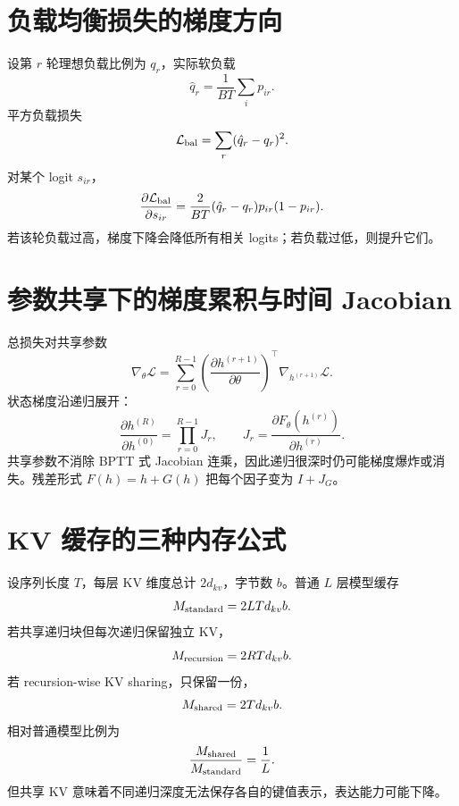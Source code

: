 \documentclass[UTF8,12pt,a4paper,fontset=none]{ctexart}
\numberwithin{equation}{section}
\newcommand{\Loss}{\mathcal{L}}
\begin{document}
\section{负载均衡损失的梯度方向}
设第 $r$ 轮理想负载比例为 $q_r$，实际软负载
\begin{equation}
 \hat q_r=\frac1{BT}\sum_i p_{ir}.
\end{equation}
平方负载损失
\begin{equation}
 \Loss_{\rm bal}=\sum_r(\hat q_r-q_r)^2.
\end{equation}
对某个 logit $s_{ir}$，
\begin{equation}
 \frac{\partial\Loss_{\rm bal}}{\partial s_{ir}}
 =\frac{2}{BT}(\hat q_r-q_r)p_{ir}(1-p_{ir}).
\end{equation}
若该轮负载过高，梯度下降会降低所有相关 logits；若负载过低，则提升它们。

\section{参数共享下的梯度累积与时间 Jacobian}
总损失对共享参数
\begin{equation}
 \nabla_\theta\Loss
 =\sum_{r=0}^{R-1}
 \left(\frac{\partial h^{(r+1)}}{\partial\theta}\right)^\top
 \nabla_{h^{(r+1)}}\Loss.
\end{equation}
状态梯度沿递归展开：
\begin{equation}
 \frac{\partial h^{(R)}}{\partial h^{(0)}}
 =\prod_{r=0}^{R-1}J_r,
 \qquad J_r=\frac{\partial F_\theta(h^{(r)})}{\partial h^{(r)}}.
\end{equation}
共享参数不消除 BPTT 式 Jacobian 连乘，因此递归很深时仍可能梯度爆炸或消失。残差形式 $F(h)=h+G(h)$ 把每个因子变为 $I+J_G$。

\section{KV 缓存的三种内存公式}
设序列长度 $T$，每层 KV 维度总计 $2d_{kv}$，字节数 $b$。普通 $L$ 层模型缓存
\begin{equation}
 M_{\rm standard}=2LTd_{kv}b.
\end{equation}
若共享递归块但每次递归保留独立 KV，
\begin{equation}
 M_{\rm recursion}=2RTd_{kv}b.
\end{equation}
若 recursion-wise KV sharing，只保留一份，
\begin{equation}
 M_{\rm shared}=2Td_{kv}b.
\end{equation}
相对普通模型比例为
\begin{equation}
 \frac{M_{\rm shared}}{M_{\rm standard}}=\frac1L.
\end{equation}
但共享 KV 意味着不同递归深度无法保存各自的键值表示，表达能力可能下降。
\end{document}
